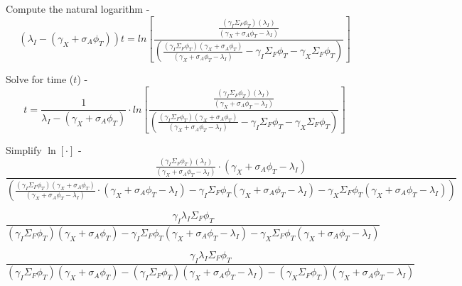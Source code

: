 \documentclass[11pt,a4paper]{article}
\begin{document}
\noindent Compute the natural logarithm - 
\begin{equation}
    (\lambda_I-(\gamma_X+\sigma_A\phi_T))t=ln[\frac{\frac{(\gamma_I\Sigma_F\phi_T)(\lambda_I)}{(\gamma_X+\sigma_A\phi_T-\lambda_I)}}{(\frac{(\gamma_I\Sigma_F\phi_T)(\gamma_X+\sigma_A\phi_T)}{(\gamma_X+\sigma_A\phi_T-\lambda_I)}-\gamma_I\Sigma_F\phi_T-\gamma_X\Sigma_F\phi_T)}]
\end{equation}
\vspace{\baselineskip}

\noindent Solve for time ($t$) - 
\begin{equation} \label{eq-xe-equil-time}
    t=\frac{1}{\lambda_I-(\gamma_X+\sigma_A\phi_T)}\cdot  ln[\frac{\frac{(\gamma_I\Sigma_F\phi_T)(\lambda_I)}{(\gamma_X+\sigma_A\phi_T-\lambda_I)}}{(\frac{(\gamma_I\Sigma_F\phi_T)(\gamma_X+\sigma_A\phi_T)}{(\gamma_X+\sigma_A\phi_T-\lambda_I)}-\gamma_I\Sigma_F\phi_T-\gamma_X\Sigma_F\phi_T)}]
\end{equation}
\vspace{\baselineskip}

\noindent Simplify $\ln[\cdot]$ - 
\begin{equation}
    \frac{\frac{(\gamma_I\Sigma_F\phi_T)(\lambda_I)}{(\gamma_X+\sigma_A\phi_T-\lambda_I)} \cdot (\gamma_X+\sigma_A\phi_T-\lambda_I)}{(\frac{(\gamma_I\Sigma_F\phi_T)(\gamma_X+\sigma_A\phi_T)}{(\gamma_X+\sigma_A\phi_T-\lambda_I)} \cdot (\gamma_X+\sigma_A\phi_T-\lambda_I) - \gamma_I\Sigma_F\phi_T(\gamma_X+\sigma_A\phi_T-\lambda_I) - \gamma_X\Sigma_F\phi_T(\gamma_X+\sigma_A\phi_T-\lambda_I))}
\end{equation}
\vspace{\baselineskip}

\begin{equation}
    \frac{
        \gamma_I\lambda_I\Sigma_F\phi_T
    }
    {
        (\gamma_I\Sigma_F\phi_T)(\gamma_X+\sigma_A\phi_T)
        - \gamma_I\Sigma_F\phi_T(\gamma_X+\sigma_A\phi_T-\lambda_I) 
        - \gamma_X\Sigma_F\phi_T(\gamma_X+\sigma_A\phi_T-\lambda_I)
    }
\end{equation}
\vspace{\baselineskip}

\begin{equation}
    \frac{
        \gamma_I\lambda_I\Sigma_F\phi_T
    }
    {
        (\gamma_I\Sigma_F\phi_T)(\gamma_X+\sigma_A\phi_T)
        - (\gamma_I\Sigma_F\phi_T)(\gamma_X+\sigma_A\phi_T-\lambda_I) 
        - (\gamma_X\Sigma_F\phi_T)(\gamma_X+\sigma_A\phi_T-\lambda_I)
    }
\end{equation}
\vspace{\baselineskip}
\end{document}
